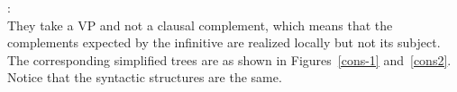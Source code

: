 \documentclass[output=paper
	        ,collection
	        ,collectionchapter
 	        ,biblatex
                ,babelshorthands
                ,newtxmath
                ,draftmode
                ,colorlinks, citecolor=brown
]{langscibook}
\begin{document}
\eas
{}:\\
\zs
They take a VP and not a clausal complement, which means that the complements expected by the infinitive are realized locally but not its subject. The  corresponding simplified trees are as shown in Figures~\ref{cons-1} and~\ref{cons2}. Notice that the syntactic structures are the same.
\end{document}
